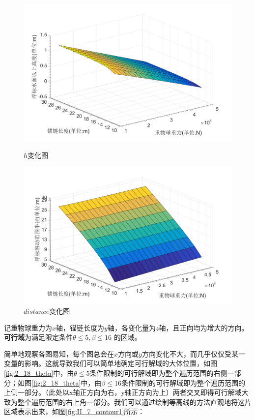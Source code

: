 \documentclass{cumcm}
\begin{document}
\begin{figure}[H]
  \begin{minipage}[t]{0.5\linewidth}   
    \centering   
    \includegraphics[width=\textwidth]{img/II_18_h.jpg}   
    \caption{$h$变化图}   
    \label{fig:2_18_h}   
  \end{minipage}
   \begin{minipage}[t]{0.5\linewidth} %
      \centering   
      \includegraphics[width=\textwidth]{img/II_18_distance.jpg}   
      \caption{$distance$变化图}   
      \label{fig:2_18_distance}   
    \end{minipage} 
\end{figure}
记重物球重力为$x$轴，锚链长度为$y$轴，各变化量为$z$轴，且正向均为增大的方向。\textbf{可行域}为满足限定条件$\theta\le 5,\beta\le 16$ 的区域。\par 
简单地观察各图易知，每个图总会在$x$方向或$y$方向变化不大，而几乎仅仅受某一变量的影响。这就导致我们可以简单地确定可行解域的大体位置，如图\ref{fig:2_18_theta}中，由$\theta\le 5$条件限制的可行解域即为整个遍历范围的右侧一部分；如图\ref{fig:2_18_theta}中，由$\beta\le 16$条件限制的可行解域即为整个遍历范围的上侧一部分。（此处以x轴正方向为右，y轴正方向为上）两者交叉即得可行解域大致为整个遍历范围的右上角一部分。我们可以通过绘制等高线的方法直观地将这片区域表示出来，如图\ref{fig:II_7_contour1}所示：\par
\end{document}
